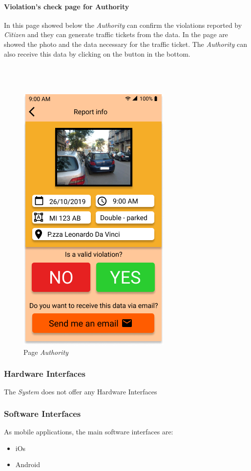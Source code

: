 \documentclass{article}
\begin{document}
\paragraph{Violation's check page for Authority}
In this page showed below the \textit{Authority} can confirm the violations reported by \textit{Citizen} and they can
generate traffic tickets from the data. In the page are showed the photo and the data necessary for the traffic ticket.
The \textit{Authority} can also receive this data by clicking on the button in the bottom.
\\
\\
\\
\\ 
\begin{figure}[H]
    \centering
    \includegraphics[scale=0.5]{img/mockups/page_authority.png}
    \caption{Page \textit{Authority}}
\end{figure}

\subsubsection{Hardware Interfaces}
The \textit{System} does not offer any Hardware Interfaces
\subsubsection{Software Interfaces}
As mobile applications, the main software interfaces are:
\begin{itemize}
    \item iOs
    \item Android
\end{itemize}
\end{document}
